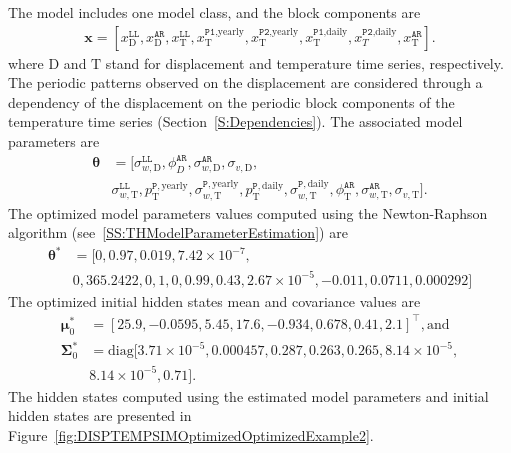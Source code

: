 The model includes one model class, and the block components are 
\begin{gather*}
\textbf{x}=[x^{\mathtt{LL}}_{\text{D}}, x^{\mathtt{AR}}_{\text{D}}, x^{\mathtt{LL}}_{\text{T}}, x^{\mathtt{P1}\text{,yearly}}_{\text{T}}, x^{\mathtt{P2}\text{,yearly}}_{\text{T}}, x^{\mathtt{P1}\text{,daily}}_{\text{T}} , x^{\mathtt{P2}\text{,daily}}_{T}, x^{\mathtt{AR}}_{\text{T}}].
\end{gather*}
where $\text{D}$ and $\text{T}$ stand for displacement and temperature time series, respectively.
The periodic patterns observed on the displacement are considered through a dependency of the displacement on the periodic block components of the temperature time series (Section~\ref{S:Dependencies}).
The associated model parameters are
\begin{align*}
\bm\theta & =[\sigma_{w, \text{D}}^{\mathtt{LL}}, \phi^{\mathtt{AR}}_{D}, \sigma_{w, \text{D}}^{\mathtt{AR}}, \sigma_{v, \text{D}},  \\
&  \sigma_{w, \text{T}}^{\mathtt{LL}},  p^{\mathtt{P}, \text{yearly}}_{\text{T}}, \sigma_{w, \text{T}}^{\mathtt{P}, \text{yearly}} , p^{\mathtt{P}, \text{daily}}_{\text{T}} , \sigma_{w, \text{T}}^{\mathtt{P}, \text{daily}}, \phi^{\mathtt{AR}}_{\text{T}}, \sigma_{w, \text{T}}^{\mathtt{AR}}, \sigma_{v, \text{T}}].
\end{align*}
The optimized model parameters values computed using the Newton-Raphson algorithm (see~\ref{SS:THModelParameterEstimation}) are
\begin{align*}
 \bm\theta^{\text{*}}& =[0, 0.97, 0.019, 7.42\times10^{-7},  \\
 & 0, 365.2422, 0, 1, 0, 0.99, 0.43, 2.67\times10^{-5}, -0.011, 0.0711, 0.000292 ]
\end{align*}
The optimized initial hidden states mean and covariance values are 
\begin{align*}
\bm \mu^{*}_{0} & = [	 25.9  ,	-0.0595	, 5.45  	, 17.6  ,	-0.934	, 0.678 ,	0.41  ,	2.1]^{\intercal}, \text{and} \\
\bm\Sigma^{*}_{0} & = \text{diag} [	3.71\times10^{-5},	0.000457	, 0.287 	, 0.263 ,	0.265 	,8.14\times10^{-5}	, \\
 & 8.14\times10^{-5}	, 0.71    ].
 \end{align*}
The hidden states computed using the estimated model parameters and initial hidden states are presented in Figure~\ref{fig:DISPTEMPSIMOptimizedOptimizedExample2}.


